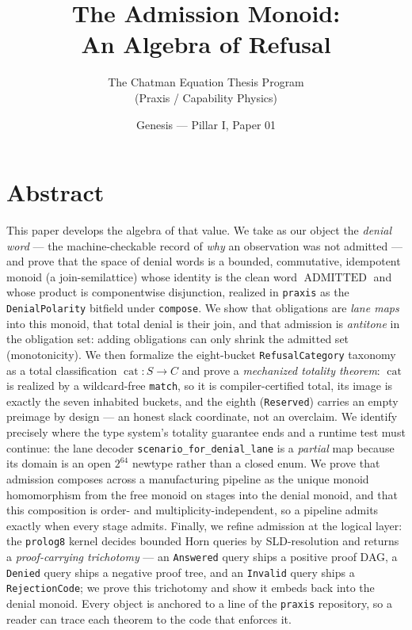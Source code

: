 \documentclass[11pt,oneside]{book}
\title{\bfseries The Admission Monoid:\\[0.4em]
\large An Algebra of Refusal}
\author{The Chatman Equation Thesis Program \\ (Praxis / Capability Physics)}
\date{Genesis --- Pillar I, Paper 01}
\theoremstyle{definition}
\theoremstyle{plain}
\theoremstyle{remark}
\newcommand{\code}[1]{\texttt{#1}}
\newcommand{\Adml}{\operatorname{ADMITTED}}          %
\newcommand{\Catset}{C}              %
\newcommand{\Scnset}{S}              %
\DeclareMathOperator{\catop}{cat}
\begin{document}
\frontmatter
\maketitle

\chapter*{Abstract}
This paper develops the algebra of that value. %
We take as our object the \emph{denial word} --- the machine-checkable record of \emph{why} an observation was not admitted --- and prove that the space of denial words is a bounded, commutative, idempotent monoid (a join-semilattice) whose identity is the clean word $\Adml$ and whose product is componentwise disjunction, realized in \code{praxis} as the \code{DenialPolarity} bitfield under \code{compose}. %
We show that obligations are \emph{lane maps} into this monoid, that total denial is their join, and that admission is \emph{antitone} in the obligation set: adding obligations can only shrink the admitted set (monotonicity). %
We then formalize the eight-bucket \code{RefusalCategory} taxonomy as a total classification $\catop:\Scnset\to\Catset$ and prove a \emph{mechanized totality theorem}: $\catop$ is realized by a wildcard-free \code{match}, so it is compiler-certified total, its image is exactly the seven inhabited buckets, and the eighth (\code{Reserved}) carries an empty preimage by design --- an honest slack coordinate, not an overclaim. %
We identify precisely where the type system's totality guarantee ends and a runtime test must continue: the lane decoder \code{scenario\_for\_denial\_lane} is a \emph{partial} map because its domain is an open $2^{64}$ newtype rather than a closed enum. %
We prove that admission composes across a manufacturing pipeline as the unique monoid homomorphism from the free monoid on stages into the denial monoid, and that this composition is order- and multiplicity-independent, so a pipeline admits exactly when every stage admits. %
Finally, we refine admission at the logical layer: the \code{prolog8} kernel decides bounded Horn queries by SLD-resolution and returns a \emph{proof-carrying trichotomy} --- an \code{Answered} query ships a positive proof DAG, a \code{Denied} query ships a negative proof tree, and an \code{Invalid} query ships a \code{RejectionCode}; we prove this trichotomy and show it embeds back into the denial monoid. %
Every object is anchored to a line of the \code{praxis} repository, so a reader can trace each theorem to the code that enforces it. %
\end{document}
